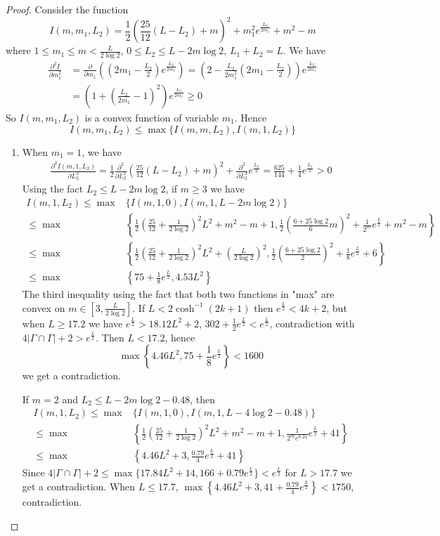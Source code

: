\documentclass[11pt, a4paper]{article}
\theoremstyle{definition}
\theoremstyle{remark}
\newcommand{\abs}[1]{\left| #1 \right|}
\newcommand{\bracket}[1]{\left( #1 \right)}
\begin{document}
\begin{proof}
 Consider the function
$$I(m,m_1,L_2)=\frac12\bracket{\frac{25}{12}(L-L_2)+m}^2+m_1^2e^{\frac{L_2}{2m_1}}+m^2-m$$
where $1\leqslant m_1\leqslant m<\frac{L}{2\log2}$, $0\leqslant L_2\leqslant L-2m\log2$, $L_1+L_2=L$.
We have
\begin{align*}
\frac{\partial^2I}{\partial m_1^2}&=\frac{\partial}{\partial m_1}\bracket{\bracket{2m_1-\frac{L_2}2}e^{\frac{L_2}{2m_1}}}=\bracket{2-\frac{L_2}{2m_1^2}\bracket{2m_1-\frac{L_2}2}}e^{\frac{L_2}{2m_1}}\\
&=\bracket{1+\bracket{\frac{L_2}{2m_1}-1}^2}e^{\frac{L_2}{2m_1}}\geqslant0
\end{align*}
So $I(m,m_1,L_2)$ is a convex function of variable $m_1$. Hence
$$I(m,m_1,L_2)\leqslant\max\{I(m,m,L_2),I(m,1,L_2)\}$$
\begin{enumerate}
\item
When $m_1=1$, we have
\begin{align*}
 \frac{\partial^2I(m,1,L_2)}{\partial L_2^2}=\frac12\frac{\partial^2}{\partial L_2^2}\bracket{\frac{25}{12}(L-L_2)+m}^2+\frac{\partial^2}{\partial L_2^2}e^{\frac{L_2}{2}}=\frac{625}{144}+\frac14e^{\frac{L_2}2}>0
\end{align*}
Using the fact $L_2\leqslant L-2m\log2$, if $m\geqslant3$ we have
\begin{align*}
 I(m,1,L_2)\leqslant \max&\{I(m,1,0),I(m,1,L-2m\log2)\}\\
\leqslant\max&\left\{\frac12\bracket{\frac{25}{12}+\frac1{2\log2}}^2L^2+m^2-m+1,\frac12\bracket{\frac{6+25\log2}6m}^2+\frac1{2^m}e^{\frac{L}2}+m^2-m\right\}\\
\leqslant \max&\left\{\frac12\bracket{\frac{25}{12}+\frac1{2\log2}}^2L^2+(\frac{L}{2\log2})^2,\frac12\bracket{\frac{6+25\log2}2}^2+\frac1{8}e^{\frac{L}2}+6\right\}\\
\leqslant\max&\left\{75+\frac18e^{\frac{L}2}, 4.53L^2\right\}
\end{align*}
The third inequality using the fact that both two functions in "max" are convex on $m\in[3,\frac{L}{2\log2}]$. If $L<2\cosh^{-1}(2k+1)$ then $e^{\frac{L}2}<4k+2$, but when $L\geqslant17.2$ we have $e^{\frac{L}2}>18.12L^2+2$, $302+\frac12e^{\frac{L}2}<e^{\frac{L}2}$, contradiction with $4\abs{\Gamma\cap\Gamma}+2>e^{\frac{L}2}$. Then $L<17.2$, hence 
$$\max\left\{4.46L^2, 75+\frac18e^{\frac{L}2}\right\}<1600$$
we get a contradiction.

If $m=2$ and $L_2\leqslant L-2m\log2-0.48$, then 
\begin{align*}
 I(m,1,L_2)\leqslant \max&\{I(m,1,0),I(m,1,L-4\log2-0.48)\}\\
\leqslant\max&\left\{\frac12\bracket{\frac{25}{12}+\frac1{2\log2}}^2L^2+m^2-m+1,\frac1{2^me^{0.24}}e^{\frac{L}2}+41\right\}\\
\leqslant \max&\left\{4.46L^2+3,\frac{0.79}{4}e^{\frac{L}2}+41\right\}
\end{align*}
Since $4\abs{\Gamma\cap\Gamma}+2\leqslant\max\{17.84L^2+14, 166+{0.79}e^{\frac{L}2}\}<e^{\frac{L}2}$ for $L>17.7$ we get a contradiction. When $L\leqslant17.7$, $\max\left\{4.46L^2+3, 41+\frac{0.79}{4}e^{\frac{L}2}\right\}<1750$, contradiction.




\end{enumerate}
\end{proof}
\end{document}
